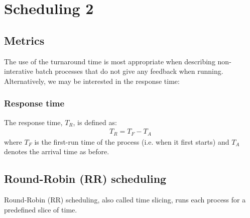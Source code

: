 \chapter{Scheduling 2}
\label{ch:scheduling-2}



\section{Metrics}

The use of the turnaround time is most appropriate when describing non-interative batch processes that do not give any feedback when running.
Alternatively, we may be interested in the response time: 

\subsection{Response time}
\label{sec:response-time}

The response time, $T_R$, is defined as: 
\begin{align}
  T_R = T_F - T_A \label{eq:response-time}
\end{align}
where $T_F$ is the first-run time of the process (i.e. when it first starts) and $T_A$ denotes the arrival time as before.

\section{Round-Robin (RR) scheduling}
\label{sec:rr}

Round-Robin (RR) scheduling, also called time slicing, runs each process for a predefined slice of time.


